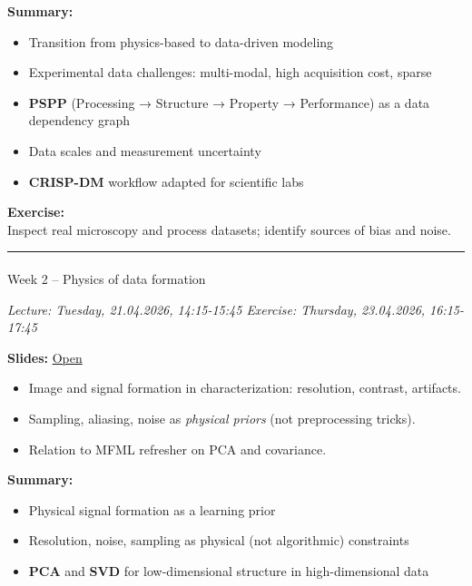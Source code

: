 \documentclass[
]{agujournal2019}
\makeatletter
\let\oldparagraph\paragraph
\renewcommand{\paragraph}{
    \@ifstar
      \xxxParagraphStar
      \xxxParagraphNoStar
  }
\newcommand{\xxxParagraphStar}[1]{\oldparagraph*{#1}\mbox{}}
\newcommand{\xxxParagraphNoStar}[1]{\oldparagraph{#1}\mbox{}}
\providecommand{\tightlist}{%
  \setlength{\itemsep}{0pt}\setlength{\parskip}{0pt}}
\makeatother
\begin{document}
\textbf{Summary:}

\begin{itemize}
\tightlist
\item
  Transition from physics-based to data-driven modeling
\item
  Experimental data challenges: multi-modal, high acquisition cost,
  sparse
\item
  \textbf{PSPP} (Processing → Structure → Property → Performance) as a
  data dependency graph
\item
  Data scales and measurement uncertainty
\item
  \textbf{CRISP-DM} workflow adapted for scientific labs
\end{itemize}

\textbf{Exercise:}\\
Inspect real microscopy and process datasets; identify sources of bias
and noise.

\begin{center}\rule{0.5\linewidth}{0.5pt}\end{center}

\paragraph{Week 2 -- Physics of data
formation}\label{week-2-physics-of-data-formation}

\emph{Lecture: Tuesday, 21.04.2026, 14:15-15:45 \textbar{} Exercise:
Thursday, 23.04.2026, 16:15-17:45}

\textbf{Slides:}
\href{https://pelzlab.science/public_presentations/ml_for_characterization_and_processing/unit02_physics_of_data/01_intro.html}{Open}

\begin{itemize}
\tightlist
\item
  Image and signal formation in characterization: resolution, contrast,
  artifacts.
\item
  Sampling, aliasing, noise as \emph{physical priors} (not preprocessing
  tricks).
\item
  Relation to MFML refresher on PCA and covariance.
\end{itemize}

\textbf{Summary:}

\begin{itemize}
\tightlist
\item
  Physical signal formation as a learning prior
\item
  Resolution, noise, sampling as physical (not algorithmic) constraints
\item
  \textbf{PCA} and \textbf{SVD} for low-dimensional structure in
  high-dimensional data
\end{itemize}
\end{document}
